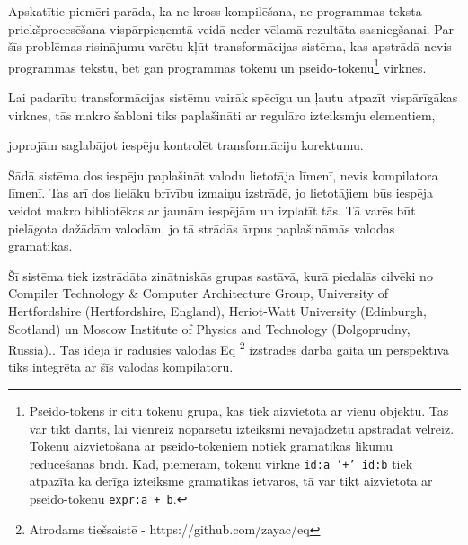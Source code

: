Apskatītie piemēri parāda, ka ne kross-kompilēšana, ne programmas teksta priekšprocesēšana vispārpieņemtā veidā neder vēlamā rezultāta sasniegšanai. Par šīs problēmas risinājumu varētu kļūt transformācijas sistēma, kas apstrādā nevis programmas tekstu, bet gan programmas tokenu un pseido-tokenu\footnote{Pseido-tokens ir citu tokenu grupa, kas tiek aizvietota ar vienu objektu. Tas var tikt darīts, lai vienreiz noparsētu izteiksmi nevajadzētu apstrādāt vēlreiz. Tokenu aizvietošana ar pseido-tokeniem notiek gramatikas likumu reducēšanas brīdī. Kad, piemēram, tokenu virkne \texttt{{id:a} '+' {id:b}} tiek atpazīta ka derīga izteiksme gramatikas ietvaros, tā var tikt aizvietota ar pseido-tokenu \texttt{{expr:a + b}}.} virknes. 

Lai padarītu transformācijas sistēmu vairāk spēcīgu un ļautu atpazīt vispārīgākas virknes, tās makro šabloni tiks paplašināti ar regulāro izteiksmju elementiem,

 joprojām saglabājot iespēju kontrolēt transformāciju korektumu.

Šādā sistēma dos iespēju paplašināt valodu lietotāja līmenī, nevis kompilatora līmenī. Tas arī dos lielāku brīvību izmaiņu izstrādē, jo lietotājiem būs iespēja veidot makro bibliotēkas ar jaunām iespējām un izplatīt tās. Tā varēs būt pielāgota dažādām valodām, jo tā strādās ārpus paplašināmās valodas gramatikas.

Šī sistēma tiek izstrādāta zinātniskās grupas sastāvā, kurā piedalās cilvēki no Compiler Technology \& Computer Architecture Group, University of Hertfordshire (Hertfordshire, England), Heriot-Watt University (Edinburgh, Scotland) un Moscow Institute of Physics and Technology (Dolgoprudny, Russia).. Tās ideja ir radusies valodas Eq \footnote{Atrodams tiešsaistē - https://github.com/zayac/eq} izstrādes darba gaitā un perspektīvā tiks integrēta ar šīs valodas kompilatoru.